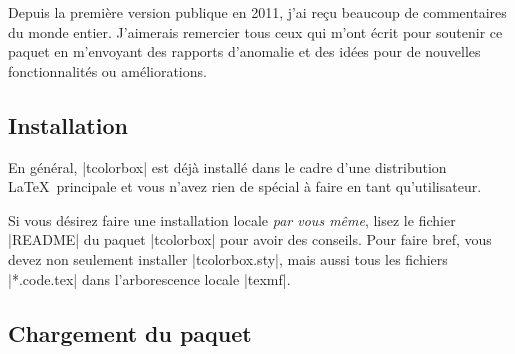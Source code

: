 {\begin{tcolorbox}[enhanced,boxrule=0mm,boxsep=0mm,frame hidden,interior hidden,
  left=0mm,right=0mm,top=0mm,bottom=0mm,watermark opacity=0.25,watermark zoom=1.2,before=\par\smallskip,
  clip watermark=false,
  watermark tikz={%
    \path[fill=yellow,draw=yellow!75!red] (0,0) circle (1cm);
    \fill[red] (45:5mm) circle (1mm);
    \fill[red] (135:5mm) circle (1mm);
    \draw[line width=1mm,red] (215:5mm) arc (215:325:5mm);}]
Depuis la première version publique en 2011, j'ai reçu beaucoup de commentaires du monde entier.
J'aimerais remercier tous ceux qui m'ont écrit pour soutenir ce paquet en m'envoyant des
rapports d'anomalie et des idées pour de nouvelles fonctionnalités ou améliorations.
\end{tcolorbox}



\subsection{Installation}

En général, |tcolorbox| est déjà installé dans le cadre d'une distribution
 \LaTeX\ principale et vous n'avez rien de spécial à faire en tant qu'utilisateur.


Si vous désirez faire une installation locale  \emph{par vous même}, lisez le fichier
|README| du paquet |tcolorbox| pour avoir des conseils. Pour faire bref, vous devez non
seulement installer |tcolorbox.sty|, mais aussi tous les fichiers |*.code.tex| dans
l'arborescence locale |texmf|.

\subsection{Chargement du paquet}

}
